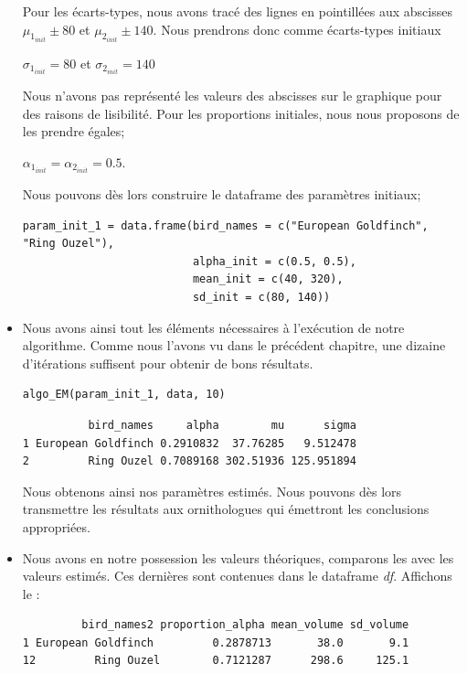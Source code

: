 \documentclass[frenchb]{report}
\newcommand{\1}{\mathbbm{1}}
\theoremstyle{definition}\newtheorem{defn}{Définition}
\theoremstyle{definition}\newtheorem{exm}{Exemple}
\theoremstyle{definition}\newtheorem{nota}{Notation}
\theoremstyle{definition}\newtheorem{rem}{Remarque}
\begin{document}
\begin{itemize}[label=\adfflowerleft]
\begin{center}
\end{center}
Pour les écarts-types, nous avons tracé des lignes en pointillées aux abscisses $\mu_{1_{init}} \pm 80$ et $\mu_{2_{init}} \pm 140$. Nous prendrons donc comme écarts-types initiaux 
\begin{center}
$\sigma_{1_{init}} =  80$ et $\sigma_{2_{init}} = 140$
\end{center}
Nous n'avons pas représenté les valeurs des abscisses sur le graphique pour des raisons de lisibilité.\newline
Pour les proportions initiales, nous nous proposons de les prendre égales;  
\begin{center}
$\alpha_{1_{init}}=\alpha_{2_{init}}=0.5$.
\end{center}
Nous pouvons dès lors construire le dataframe des paramètres initiaux;

\begin{lstlisting}
param_init_1 = data.frame(bird_names = c("European Goldfinch", "Ring Ouzel"),
                          alpha_init = c(0.5, 0.5),
                          mean_init = c(40, 320),
                          sd_init = c(80, 140))

\end{lstlisting}

\item Nous avons ainsi tout les éléments nécessaires à l'exécution de notre algorithme. Comme nous l'avons vu dans le précédent chapitre, une dizaine d'itérations suffisent pour obtenir de bons résultats.

\begin{lstlisting}
algo_EM(param_init_1, data, 10)
\end{lstlisting}

\begin{verbatim}
          bird_names     alpha        mu      sigma
1 European Goldfinch 0.2910832  37.76285   9.512478
2         Ring Ouzel 0.7089168 302.51936 125.951894
\end{verbatim}
Nous obtenons ainsi nos paramètres estimés. Nous pouvons dès lors transmettre les résultats aux ornithologues qui émettront les conclusions appropriées. 
\newpage
\item Nous avons en notre possession les valeurs théoriques, comparons les avec les valeurs estimés. Ces dernières sont contenues dans le dataframe \textit{df}. Affichons le :
\begin{verbatim}
         bird_names2 proportion_alpha mean_volume sd_volume
1 European Goldfinch         0.2878713       38.0       9.1
12         Ring Ouzel        0.7121287      298.6     125.1
\end{verbatim}


\end{itemize}
\end{document}

